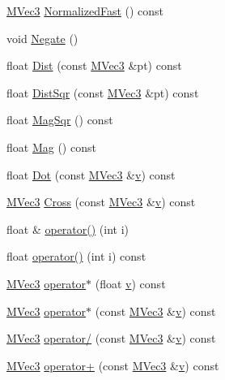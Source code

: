\begin{CompactItemize}
\item 
\hyperlink{class_m_vec3}{MVec3} \hyperlink{class_m_vec3_4b2ec5935a0621b83cd7fab8187acfb2}{NormalizedFast} () const 
\item 
void \hyperlink{class_m_vec3_a99b7529b11e93834480d70092542e24}{Negate} ()
\item 
float \hyperlink{class_m_vec3_55337896656651e4e3a8214c718e5043}{Dist} (const \hyperlink{class_m_vec3}{MVec3} \&pt) const 
\item 
float \hyperlink{class_m_vec3_71ac5757ebbfabeacbf4e8337f291d7d}{DistSqr} (const \hyperlink{class_m_vec3}{MVec3} \&pt) const 
\item 
float \hyperlink{class_m_vec3_6deaf4608ece1b212f214a1d8d304cc7}{MagSqr} () const 
\item 
float \hyperlink{class_m_vec3_5dfd83de3ed52ac479d69a1c8407d495}{Mag} () const 
\item 
float \hyperlink{class_m_vec3_c224832dd149a1f44add1fa271b5b909}{Dot} (const \hyperlink{class_m_vec3}{MVec3} \&\hyperlink{glext__bak_8h_5cf89b94f7478c0ebc4429b60e7ef93b}{v}) const 
\item 
\hyperlink{class_m_vec3}{MVec3} \hyperlink{class_m_vec3_dcd74e76cefbb1b650c5dece5f115aae}{Cross} (const \hyperlink{class_m_vec3}{MVec3} \&\hyperlink{glext__bak_8h_5cf89b94f7478c0ebc4429b60e7ef93b}{v}) const 
\item 
float \& \hyperlink{class_m_vec3_22086d981dee89e4b05ba72e7f24d113}{operator()} (int i)
\item 
float \hyperlink{class_m_vec3_6b486d03008c43722da09d73a32e3d78}{operator()} (int i) const 
\item 
\hyperlink{class_m_vec3}{MVec3} \hyperlink{class_m_vec3_fe57dd320b5843747c718d28d0bb23ff}{operator$\ast$} (float \hyperlink{glext__bak_8h_5cf89b94f7478c0ebc4429b60e7ef93b}{v}) const 
\item 
\hyperlink{class_m_vec3}{MVec3} \hyperlink{class_m_vec3_dd316d1e110036f3c227ccb56e68f491}{operator$\ast$} (const \hyperlink{class_m_vec3}{MVec3} \&\hyperlink{glext__bak_8h_5cf89b94f7478c0ebc4429b60e7ef93b}{v}) const 
\item 
\hyperlink{class_m_vec3}{MVec3} \hyperlink{class_m_vec3_173620909fa0bb83955665d1784f8861}{operator/} (const \hyperlink{class_m_vec3}{MVec3} \&\hyperlink{glext__bak_8h_5cf89b94f7478c0ebc4429b60e7ef93b}{v}) const 
\item 
\hyperlink{class_m_vec3}{MVec3} \hyperlink{class_m_vec3_1c87d4e61056e93c05a97c396b1ad121}{operator+} (const \hyperlink{class_m_vec3}{MVec3} \&\hyperlink{glext__bak_8h_5cf89b94f7478c0ebc4429b60e7ef93b}{v}) const 

\end{CompactItemize}
